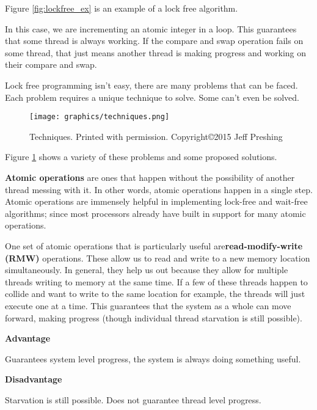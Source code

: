 \documentclass[letterpaper, 12pt]{article}
\begin{document}
Figure \ref{fig:lockfree_ex} is an example of a lock free algorithm.

In this case, we are incrementing an atomic integer in a loop. This guarantees that 
some thread is always working. If the compare and swap operation fails on some thread, 
that just means another thread is making progress and working on their compare and swap.

Lock free programming isn't easy, there are many problems that can be faced. Each 
problem requires a unique technique to solve. Some can't even be solved. 

\begin{figure}
    \centering
	\texttt{[image: graphics/techniques.png]}
	\caption{Techniques. Printed with permission. Copyright\copyright 2015 Jeff Preshing}
	\citep{introlockfree} \label{techniques}
\end{figure} 
Figure \ref{techniques} shows a variety of these problems and some proposed solutions.
\newpage

{\bfseries Atomic operations} are ones that happen without the possibility of another thread 
messing with it. In other words, atomic operations happen in a single step. Atomic operations 
are immensely helpful in implementing lock-free and wait-free algorithms; since most 
processors already have built in support for many atomic operations. 

\par\vspace{\baselineskip}
One set of atomic operations that is particularly useful are{\bfseries read-modify-write (RMW)} 
operations. These allow us to read and write to a new memory location simultaneously. In general, 
they help us out because they allow for multiple threads writing to memory at the same time. 
If a few of these threads happen to collide and want to write to the same location for example, 
the threads will just execute one at a time. This guarantees that the system as a whole can move 
forward, making progress (though individual thread starvation is still possible).  

\par\vspace{\baselineskip}

{\bfseries Advantage} \par\vspace{\baselineskip}
Guarantees system level progress, the system is always doing something useful.


{\bfseries Disadvantage} 
\par\vspace{\baselineskip}
Starvation is still possible. Does not guarantee thread level progress. 
\end{document}
